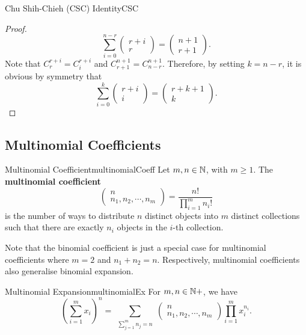 \documentclass[math]{amznotes}
\theoremstyle{remark}
\begin{document}
\begin{thmbox}{Chu Shih-Chieh (CSC) Identity}{CSC}
\begin{proof}
        \begin{equation*}
            \sum_{i = 0}^{n - r}\begin{pmatrix}
                r + i \\
                r
            \end{pmatrix} = \begin{pmatrix}
                n + 1 \\
                r + 1
            \end{pmatrix}.
        \end{equation*}
        Note that $C^{r + i}_r = C^{r + i}_i$ and $C^{n + 1}_{r + 1} = C^{n + 1}_{n - r}$. Therefore, by setting $k = n - r$, it is obvious by symmetry that
        \begin{equation*}
            \sum_{i = 0}^{k}\begin{pmatrix}
                r + i \\
                i
            \end{pmatrix} = \begin{pmatrix}
                r + k + 1 \\
                k
            \end{pmatrix}.
        \end{equation*}
    \end{proof}
\end{thmbox}
\subsection{Multinomial Coefficients}
\begin{dfnbox}{Multinomial Coefficient}{multinomialCoeff}
    Let $m, n \in \mathbb{N}$, with $m \geq 1$. The {\color{red} \textbf{multinomial coefficient}}
    \begin{displaymath}
        \begin{pmatrix}
            n \\
            n_1, n_2, \cdots, n_m
        \end{pmatrix} = \frac{n!}{\prod_{i = 1}^{m}n_i!}
    \end{displaymath}
    is the number of ways to distribute $n$ distinct objects into $m$ distinct collections such that there are exactly $n_i$ objects in the $i$-th collection.
\end{dfnbox}
Note that the binomial coefficient is just a special case for multinomial coefficients where $m = 2$ and $n_1 + n_2 = n$. Respectively, multinomial coefficients also generalise binomial expansion.
\begin{thmbox}{Multinomial Expansion}{multinomialEx}
    For $m, n \in \mathbb{N}+$, we have
    \begin{equation*}
        \left(\sum_{i = 1}^{m}x_i\right)^n = \sum_{\substack{\sum_{j = 1}^{m}n_j = n}} \begin{pmatrix}
            n \\
            n_1, n_2, \cdots, n_m
        \end{pmatrix}\prod_{i = 1}^{m}x_i^{n_i}.
    \end{equation*}
\end{thmbox}
\end{document}
